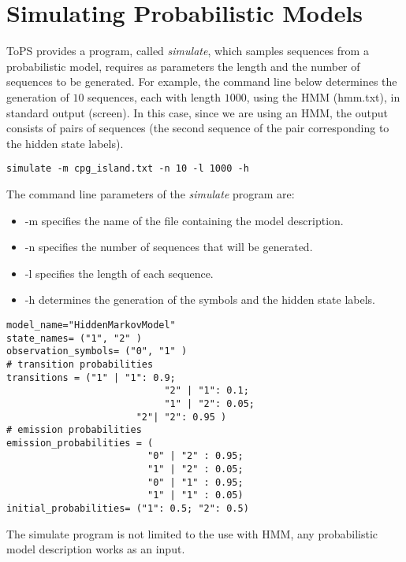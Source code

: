 \chapter{Simulating Probabilistic Models}

ToPS provides a program, called  \textit{simulate}, which samples  sequences from a probabilistic model,  requires as parameters the length  and the number of sequences to be generated. For example, the command line below determines the generation of $10$ sequences, each  with length $1000$, using the HMM (hmm.txt), in standard output (screen). In this case, since we are using an HMM, the output consists of pairs of sequences (the second sequence of the pair  corresponding to the hidden state labels).


\begin{Verbatim}[frame=single, label={Command line}]
simulate -m cpg_island.txt -n 10 -l 1000 -h
\end{Verbatim}

The command line parameters of the \textit{simulate} program are:
\begin{itemize}
\item -m specifies the name of the file containing the model description.
\item -n specifies  the number of sequences that will be generated.
\item -l specifies the length of each sequence.
\item -h determines the generation of the symbols and the hidden state labels.
\end{itemize}

\begin{Verbatim}[frame=single, label={hmm.txt}]
model_name="HiddenMarkovModel"
state_names= ("1", "2" )
observation_symbols= ("0", "1" )
# transition probabilities
transitions = ("1" | "1": 0.9;
                            "2" | "1": 0.1;
                            "1" | "2": 0.05;
                       "2"| "2": 0.95 )
# emission probabilities
emission_probabilities = (
                         "0" | "2" : 0.95; 
                         "1" | "2" : 0.05;            
                         "0" | "1" : 0.95; 
                         "1" | "1" : 0.05)
initial_probabilities= ("1": 0.5; "2": 0.5)
\end{Verbatim}

The simulate program is not limited to the use with HMM, any probabilistic model description works as an input.



